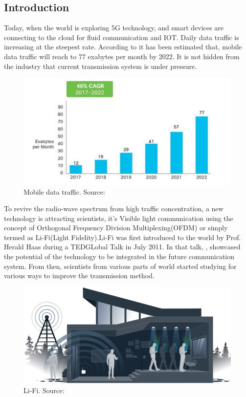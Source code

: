 \documentclass[notitlepage]{article}
\begin{document}
\subsection{Introduction}

Today, when the world is exploring 5G technology, and smart devices are
connecting to the cloud for fluid communication and IOT.  Daily data traffic is
increasing at the steepest rate. According to \textcite{cisco19} it has been
estimated that, mobile data traffic will reach to 77 exabytes per month by
2022. It is not hidden from the industry that current transmission system is
under pressure.\\

\begin{figure}[!h]
  \includegraphics{res/traffic_trend_li_fi.PNG}
    \caption{Mobile data traffic. Source: \parencite{cisco19}}
  \label{fig:traffic_trend_li_fi}
\end{figure}


To revive the radio-wave spectrum from high traffic concentration, a new
technology is attracting scientists, it's Visible light communication using the
concept of Orthogonal Frequency Division Multiplexing(OFDM) or simply termed as
Li-Fi(Light Fidelity).\newline Li-Fi was first introduced to the world by Prof.
Herald Haas during a TEDGLobal Talk in July 2011. In that talk,
\textcite{hass11}, showcased the potential of the technology to be integrated
in the future communication system. From then, scientists from various parts of
world started studying for various ways to improve the transmission method.\\

\begin{figure}[!h]
  \includegraphics[width=\linewidth]{res/tech-illustration-li-fi.png}
    \caption{Li-Fi. Source: \parencite{purelifi}}
  \label{fig:tech-illustration-li-fi}
\end{figure}
\end{document}
